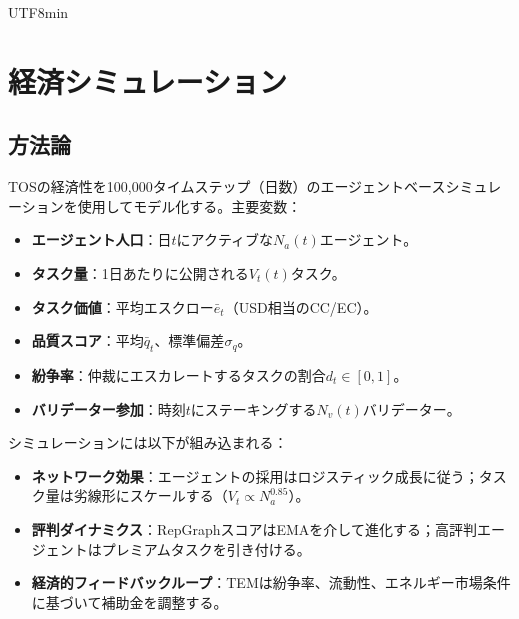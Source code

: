 \documentclass[11pt]{article}
\begin{document}
\begin{CJK}{UTF8}{min}
\section{経済シミュレーション}
\label{sec:econ-sim}

\subsection{方法論}
TOSの経済性を100,000タイムステップ（日数）のエージェントベースシミュレーションを使用してモデル化する。主要変数：
\begin{itemize}[noitemsep]
  \item \textbf{エージェント人口}：日$t$にアクティブな$N_a(t)$エージェント。
  \item \textbf{タスク量}：1日あたりに公開される$V_t(t)$タスク。
  \item \textbf{タスク価値}：平均エスクロー$\bar{e}_t$（USD相当のCC/EC）。
  \item \textbf{品質スコア}：平均$\bar{q}_t$、標準偏差$\sigma_q$。
  \item \textbf{紛争率}：仲裁にエスカレートするタスクの割合$d_t \in [0,1]$。
  \item \textbf{バリデーター参加}：時刻$t$にステーキングする$N_v(t)$バリデーター。
\end{itemize}
シミュレーションには以下が組み込まれる：
\begin{itemize}[noitemsep]
  \item \textbf{ネットワーク効果}：エージェントの採用はロジスティック成長に従う；タスク量は劣線形にスケールする（$V_t \propto N_a^{0.85}$）。
  \item \textbf{評判ダイナミクス}：RepGraphスコアはEMAを介して進化する；高評判エージェントはプレミアムタスクを引き付ける。
  \item \textbf{経済的フィードバックループ}：TEMは紛争率、流動性、エネルギー市場条件に基づいて補助金を調整する。
\end{itemize}


\end{CJK}
\end{document}
